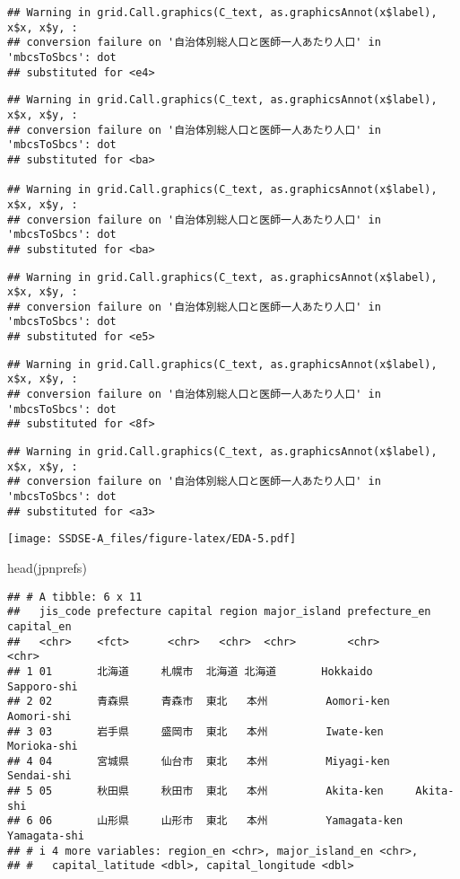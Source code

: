 \documentclass[
]{article}
\newenvironment{Shaded}{\begin{snugshade}}{\end{snugshade}}
\newcommand{\FunctionTok}[1]{\textcolor[rgb]{0.00,0.00,0.00}{#1}}
\newcommand{\NormalTok}[1]{#1}
\begin{document}
\begin{verbatim}
## Warning in grid.Call.graphics(C_text, as.graphicsAnnot(x$label), x$x, x$y, :
## conversion failure on '自治体別総人口と医師一人あたり人口' in 'mbcsToSbcs': dot
## substituted for <e4>
\end{verbatim}

\begin{verbatim}
## Warning in grid.Call.graphics(C_text, as.graphicsAnnot(x$label), x$x, x$y, :
## conversion failure on '自治体別総人口と医師一人あたり人口' in 'mbcsToSbcs': dot
## substituted for <ba>

## Warning in grid.Call.graphics(C_text, as.graphicsAnnot(x$label), x$x, x$y, :
## conversion failure on '自治体別総人口と医師一人あたり人口' in 'mbcsToSbcs': dot
## substituted for <ba>
\end{verbatim}

\begin{verbatim}
## Warning in grid.Call.graphics(C_text, as.graphicsAnnot(x$label), x$x, x$y, :
## conversion failure on '自治体別総人口と医師一人あたり人口' in 'mbcsToSbcs': dot
## substituted for <e5>
\end{verbatim}

\begin{verbatim}
## Warning in grid.Call.graphics(C_text, as.graphicsAnnot(x$label), x$x, x$y, :
## conversion failure on '自治体別総人口と医師一人あたり人口' in 'mbcsToSbcs': dot
## substituted for <8f>
\end{verbatim}

\begin{verbatim}
## Warning in grid.Call.graphics(C_text, as.graphicsAnnot(x$label), x$x, x$y, :
## conversion failure on '自治体別総人口と医師一人あたり人口' in 'mbcsToSbcs': dot
## substituted for <a3>
\end{verbatim}

\texttt{[image: SSDSE-A\_files/figure-latex/EDA-5.pdf]}

\begin{Shaded}
\begin{Highlighting}[]
\FunctionTok{head}\NormalTok{(jpnprefs)}
\end{Highlighting}
\end{Shaded}

\begin{verbatim}
## # A tibble: 6 x 11
##   jis_code prefecture capital region major_island prefecture_en capital_en  
##   <chr>    <fct>      <chr>   <chr>  <chr>        <chr>         <chr>       
## 1 01       北海道     札幌市  北海道 北海道       Hokkaido      Sapporo-shi 
## 2 02       青森県     青森市  東北   本州         Aomori-ken    Aomori-shi  
## 3 03       岩手県     盛岡市  東北   本州         Iwate-ken     Morioka-shi 
## 4 04       宮城県     仙台市  東北   本州         Miyagi-ken    Sendai-shi  
## 5 05       秋田県     秋田市  東北   本州         Akita-ken     Akita-shi   
## 6 06       山形県     山形市  東北   本州         Yamagata-ken  Yamagata-shi
## # i 4 more variables: region_en <chr>, major_island_en <chr>,
## #   capital_latitude <dbl>, capital_longitude <dbl>
\end{verbatim}
\end{document}
